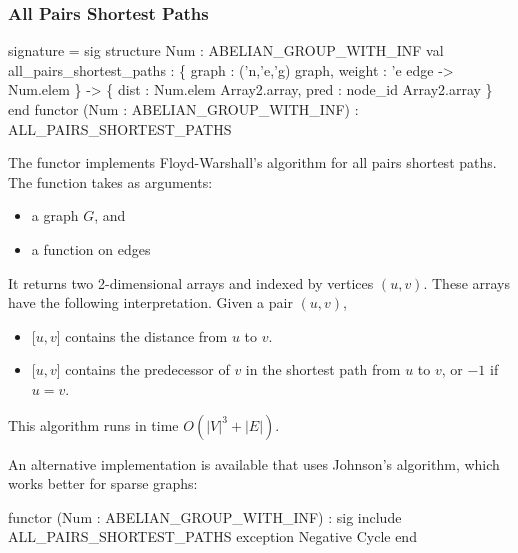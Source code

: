 \subsubsection{All Pairs Shortest Paths}
\begin{SML}
 signature  = sig 
   structure Num : ABELIAN_GROUP_WITH_INF
   val all_pairs_shortest_paths :
                 \{ graph : ('n,'e,'g) graph,
                   weight : 'e edge -> Num.elem
                 \} ->
                 \{ dist : Num.elem Array2.array,
                   pred :  node_id Array2.array
                 \}
 end
 functor (Num : ABELIAN_GROUP_WITH_INF) 
    : ALL_PAIRS_SHORTEST_PATHS
\end{SML}
The functor  implements Floyd-Warshall's algorithm
for all pairs shortest paths.  The function 
 takes as arguments: 
\begin{itemize}
\item a graph $G$, and
\item a  function on edges
\end{itemize}
It returns two 2-dimensional arrays  and 
indexed by vertices $(u,v)$.  These arrays have the following
interpretation.  Given a pair $(u,v)$,
\begin{itemize}
\item {}[$u,v$] contains the distance from $u$ to $v$.
\item {}[$u,v$] contains the predecessor of $v$ in the shortest
path from $u$ to $v$, or $-1$ if $u=v$.
\end{itemize}
This algorithm runs in time $O(|V|^3+|E|)$.

An alternative implementation is available that uses Johnson's algorithm, 
which works better for sparse graphs:
\begin{SML}
 functor (Num : ABELIAN_GROUP_WITH_INF) 
    : sig include ALL_PAIRS_SHORTEST_PATHS
          exception Negative Cycle
      end
\end{SML}

